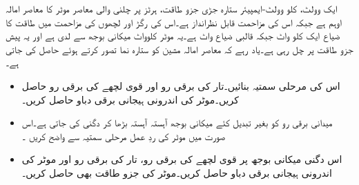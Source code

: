 %
ایک  وولٹ،  کلو وولٹ-ایمپیئر ستارہ جڑی  جزو طاقت،  ہرٹز پر چلنی والی معاصر موٹر کا معاصر امالہ  اوہم ہے جبکہ اس کی مزاحمت قابل نظرانداز ہے۔اس کی رگڑ اور لچھوں کی مزاحمت میں طاقت کا ضیاع ایک کلو واٹ جبکہ قالبی ضیاع  واٹ ہے۔یہ موٹر   کلوواٹ میکانی بوجھ سے لدی ہے اور یہ   پیش جزو طاقت   پر چل رہی ہے۔یاد رہے کہ معاصر امالہ مشین کو ستارہ نما تصور کرتے ہوئے حاصل کی جاتی ہے۔ 
\begin{itemize}
\item
اس کی مرحلی سمتیہ بنائیں۔تار کی برقی رو  اور قوی لچھے کی برقی رو   حاصل کریں۔موٹر کی اندرونی ہیجانی برقی دباو  حاصل کریں۔
\item
میدانی برقی رو کو بغیر تبدیل کئے  میکانی بوجھ آہستہ آہستہ بڑھا کر دگنی کی جاتی ہے۔اس صورت میں موٹر کی ردِ عمل مرحلی سمتیہ سے واضح کریں ۔
\item
اس دگنی میکانی بوجھ پر قوی لچھے  کی برقی رو،  تار کی برقی رو  اور موٹر کی اندرونی ہیجانی برقی دباو حاصل کریں۔موٹر کی جزو طاقت بھی حاصل کریں۔
\end{itemize}

